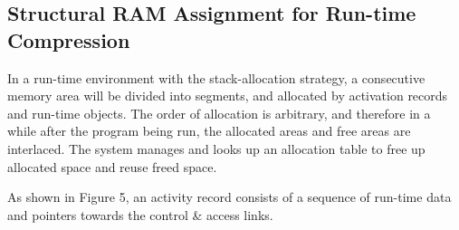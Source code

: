 \documentclass[]{article}
\begin{document}
	\subsection{Structural RAM Assignment for Run-time Compression}
	In a run-time environment with the stack-allocation strategy, a consecutive memory area will be divided into segments, and allocated by activation records and run-time objects. The order of allocation is arbitrary, and therefore in a while after the program being run, the allocated areas and free areas are interlaced. The system manages and looks up an allocation table to free up allocated space and reuse freed space. \par 
	As shown in Figure 5, an activity record consists of a sequence of run-time data and pointers towards the control \& access links. \par 
\end{document}
